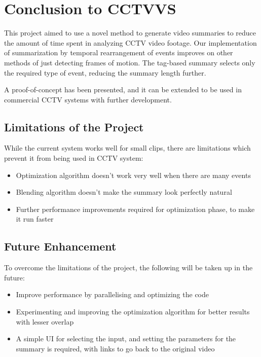 \chapter{Conclusion to CCTVVS}

This project aimed to use a novel method to generate video summaries to reduce
the amount of time spent in analyzing CCTV video footage. Our implementation of
summarization by temporal rearrangement of events improves on other methods of
just detecting frames of motion. The tag-based summary selects only the required
type of event, reducing the summary length further.

A proof-of-concept has been presented, and it can be extended to be used in
commercial CCTV systems with further development.

\section{Limitations of the Project}

While the current system works well for small clips, there are limitations which
prevent it from being used in CCTV system:
    \begin{itemize}
        \item Optimization algorithm doesn’t work very well when there are many
        events
        \item Blending algorithm doesn’t make the summary look perfectly natural
        \item Further performance improvements required for optimization phase,
        to make it run faster
    \end{itemize}

\section{Future Enhancement}

To overcome the limitations of the project, the following will be taken up in
the future:
    \begin{itemize}
        \item Improve performance by parallelising and optimizing the code
        \item Experimenting and improving the optimization algorithm for better
        results with lesser overlap
        \item A simple UI for selecting the input, and setting the parameters
        for the summary is required, with links to go back to the original video
    \end{itemize}

